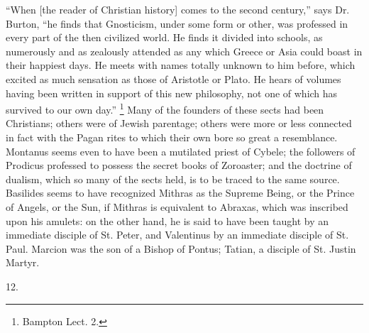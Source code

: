 ``When [the reader of Christian history] comes to
the second century,'' says Dr. Burton, ``he finds
that Gnosticism, under some form or other, was professed
in every part of the then civilized world. He finds it
divided into schools, as numerously and as zealously
attended as any which Greece or Asia could boast in their
happiest days. He meets with names totally unknown to him
before, which excited as much sensation as those of
Aristotle or Plato. He hears of volumes having been
written in support of this new philosophy, not one of
which has survived to our own day.'' \footnote{Bampton Lect. 2.} Many
of the founders of these sects had been Christians;
others were of Jewish parentage; others were more or less
connected in fact with the Pagan rites to which their own
bore so great a resemblance. Montanus seems even to have
been a mutilated priest of Cybele; the followers of
Prodicus professed to possess the secret books of
Zoroaster; and the doctrine of dualism, which so many of
the sects held, is to be traced to the same source.
Basilides seems to have recognized Mithras as the Supreme
Being, or the Prince of Angels, or the Sun, if Mithras is
equivalent to Abraxas, which was inscribed upon his
amulets: on the other hand, he is said to have been
taught by an immediate disciple of St. Peter, and
Valentinus by an immediate disciple of St. Paul. Marcion
was the son of a Bishop of Pontus; Tatian, a disciple of
St. Justin Martyr.

12.

